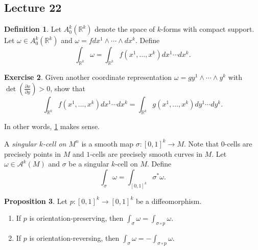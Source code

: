 \documentclass[10pt,letterpaper,cm]{nupset}
\theoremstyle{definition}
\newtheorem{definition}{Definition}[subsection]
\theoremstyle{theorem}
\newtheorem{prop}[definition]{Proposition}
\newtheorem{exercise}[definition]{Exercise}
\theoremstyle{remark}
\newcommand{\R}{\mathbb R}
\newcommand{\1}{\mathbf{1}}
\newcommand{\0}{\vec 0}
\begin{document}
\subsection{Lecture 22}


\begin{definition}\label{forms}
Let $A_0^k\left(\R^k\right)$ denote the space of $k$-forms with compact support. Let $\omega \in A_0^k(\R^k)$ and  $\omega = fdx^1\wedge \cdots \wedge dx^k$. Define $$ \int_{\R^k}\omega = \int_{\R^k} f(x^1, \ldots, x^k)dx^1\cdots dx^k  .$$
\end{definition}

\begin{exercise}
Given another coordinate representation $\omega = gy^1 \wedge \cdots \wedge y^k$ with $\det\left(\frac{\partial{x}}{\partial{y}}\right) >0$, show that $$\int_{\R^k} f(x^1, \ldots, x^k)dx^1\cdots dx^k  = \int_{\R^k} g(x^1, \ldots, x^k)dy^1\cdots dy^k.$$
\end{exercise}

In other words, \cref{forms} makes sense.

\medskip


A \textit{singular $k$-cell on $M^n$} is a smooth map $\sigma : \left[0,1\right]^k \to M$.
Note that $0$-cells are precisely points in $M$ and $1$-cells are precisely smooth curves in $M$.
Let $\omega \in \mathcal{A}^k(M)$ and $\sigma$ be a singular $k$-cell on $M$. Define $$ \int_{\sigma} \omega = \int_{\left[0,1\right]^k}\sigma^{\ast}\omega  .$$


\begin{prop}\label{preserve}
Let $p: \left[0,1\right]^k \to \left[0,1\right]^k$ be a diffeomorphism. 
\begin{enumerate}
\item If $p$ is orientation-preserving, then $\int_{\sigma} \omega = \int_{\sigma \circ p} \omega$. 
\item If $p$ is orientation-reversing, then $\int_{\sigma} \omega = {-\int_{\sigma \circ p} \omega}.$
\end{enumerate}
\end{prop}
\end{document}

